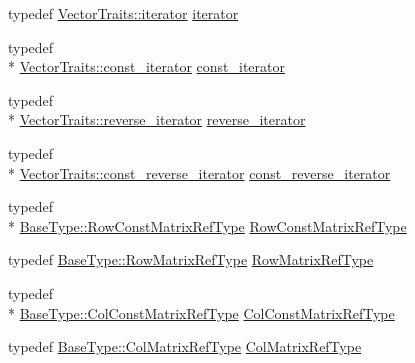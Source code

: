 \begin{DoxyCompactItemize}
typedef \hyperlink{classvct_fixed_size_vector_traits_a4c4cff693ac7f81edfb240a208506309}{Vector\-Traits\-::iterator} \hyperlink{classvct_fixed_size_vector_base_a541b35f08260e286587f4aa516a83d82}{iterator}
\item 
typedef \\*
\hyperlink{classvct_fixed_size_vector_traits_a9c7e38590e4a27350095e89a84dc0d09}{Vector\-Traits\-::const\-\_\-iterator} \hyperlink{classvct_fixed_size_vector_base_a178701dffe8173212039cd3edcb8697d}{const\-\_\-iterator}
\item 
typedef \\*
\hyperlink{classvct_fixed_size_vector_traits_a46a61657ee7bece7277e0b59c4e0ea41}{Vector\-Traits\-::reverse\-\_\-iterator} \hyperlink{classvct_fixed_size_vector_base_af7dffb6aaecd3c33141026726e3a4852}{reverse\-\_\-iterator}
\item 
typedef \\*
\hyperlink{classvct_fixed_size_vector_traits_a66365350e5fae26c9cf29a3ce0bb4a60}{Vector\-Traits\-::const\-\_\-reverse\-\_\-iterator} \hyperlink{classvct_fixed_size_vector_base_a51b27cb7a2a0f7cd5c3352deda9bce98}{const\-\_\-reverse\-\_\-iterator}
\end{DoxyCompactItemize}
{\bf }\par
\begin{DoxyCompactItemize}
\item 
typedef \\*
\hyperlink{classvct_fixed_size_const_vector_base_ab7c118dbf79db9194157ced0e4549814}{Base\-Type\-::\-Row\-Const\-Matrix\-Ref\-Type} \hyperlink{classvct_fixed_size_vector_base_a8f1918b51b34a75973890b1b898b1991}{Row\-Const\-Matrix\-Ref\-Type}
\item 
typedef \hyperlink{classvct_fixed_size_const_vector_base_a1f9ff7c6b2b3f98c51d1bf3eefdfbd32}{Base\-Type\-::\-Row\-Matrix\-Ref\-Type} \hyperlink{classvct_fixed_size_vector_base_a880e7f696c2064b9e0339290e6a92c3f}{Row\-Matrix\-Ref\-Type}
\end{DoxyCompactItemize}

{\bf }\par
\begin{DoxyCompactItemize}
\item 
typedef \\*
\hyperlink{classvct_fixed_size_const_vector_base_a7dd213f3b90969b8c89fd0766cf0a70e}{Base\-Type\-::\-Col\-Const\-Matrix\-Ref\-Type} \hyperlink{classvct_fixed_size_vector_base_af2eb123c105381e108d3a94c3ba301b4}{Col\-Const\-Matrix\-Ref\-Type}
\item 
typedef \hyperlink{classvct_fixed_size_const_vector_base_ac2454662f16abd75fdef4ce8d2a00a48}{Base\-Type\-::\-Col\-Matrix\-Ref\-Type} \hyperlink{classvct_fixed_size_vector_base_a6b661e308612cbe1c894c62812c272e2}{Col\-Matrix\-Ref\-Type}
\end{DoxyCompactItemize}


